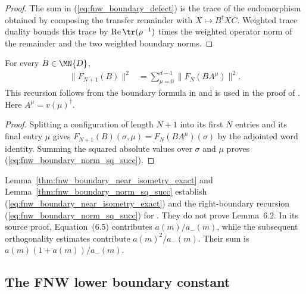 \begin{proof}
    \leanok
    The sum in (\ref{eq:fnw_boundary_defect}) is the trace of the
    endomorphism obtained by composing the transfer remainder with
    $X\mapsto B^\dagger XC$. Weighted trace duality bounds this trace by
    $\operatorname{Re}\tr(\rho^{-1})$ times the weighted operator norm of the
    remainder and the two weighted boundary norms.
\end{proof}

\begin{lemma}
    \label{thm:fnw_boundary_norm_sq_succ}
    \leanok
    For every $B\in\MN{D}$,
    \begin{align}
        \lVert F_{N+1}(B)\rVert^2
         & =\sum_{\mu=0}^{d-1}\lVert F_N(BA^\mu)\rVert^2.
        \label{eq:fnw_boundary_norm_sq_succ}
    \end{align}
    This recursion follows from the boundary formula in
    \cite[Equation~(5.5)]{Fannes1992Finitely} and is used in the proof of
    \cite[Lemma~5.3]{Fannes1992Finitely}. Here
    $A^\mu=v(\mu)^\dagger$.
\end{lemma}

\begin{proof}
    \leanok
    Splitting a configuration of length $N+1$ into its first $N$ entries and its
    final entry $\mu$ gives
    $F_{N+1}(B)(\sigma,\mu)=F_N(BA^\mu)(\sigma)$ by the adjointed word identity. Summing the squared absolute
    values over $\sigma$ and $\mu$ proves
    (\ref{eq:fnw_boundary_norm_sq_succ}).
\end{proof}

Lemma~\ref{thm:fnw_boundary_near_isometry_exact} and
Lemma~\ref{thm:fnw_boundary_norm_sq_succ} establish
(\ref{eq:fnw_boundary_near_isometry_exact}) and the right-boundary
recursion (\ref{eq:fnw_boundary_norm_sq_succ}) for
\cite[Lemma~5.3]{Fannes1992Finitely}. They do not prove Lemma~6.2. In its source
proof, Equation~(6.5) contributes $a(m)/a_-(m)$, while the subsequent
orthogonality estimates contribute $a(m)^2/a_-(m)$. Their sum is
$a(m)(1+a(m))/a_-(m)$.

\subsection{The FNW lower boundary constant}
\label{subsec:fnw_lower_boundary_constant}

